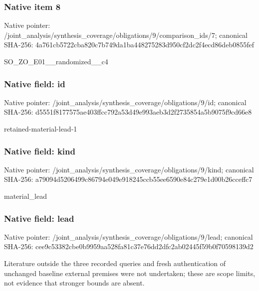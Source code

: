 \documentclass[10pt,a4paper]{article}
\begin{document}
\subsubsection{Native item 8}
Native pointer: /joint\_\allowbreak{}analysis/synthesis\_\allowbreak{}coverage/obligations/9/comparison\_\allowbreak{}ids/7; canonical SHA-256: 4a761cb5722cba820c7b749da1ba448275283d950cf2dc2f4ecd86deb0855fef

\begingroup\raggedright\sloppy SO\_\allowbreak{}ZO\_\allowbreak{}E01\_\allowbreak{}\_\allowbreak{}randomized\_\allowbreak{}\_\allowbreak{}c4\par\endgroup

\subsubsection{Native field: id}
Native pointer: /joint\_\allowbreak{}analysis/synthesis\_\allowbreak{}coverage/obligations/9/id; canonical SHA-256: d5551f8177575ae403ffcc792a53d49e993aeb3d2f2735854a5b9075f9cd66e8

\begingroup\raggedright\sloppy retained-material-lead-1\par\endgroup

\subsubsection{Native field: kind}
Native pointer: /joint\_\allowbreak{}analysis/synthesis\_\allowbreak{}coverage/obligations/9/kind; canonical SHA-256: a79094d5206499c86794e049e918245ccb55ee6590e84c279e1d00b26cceffc7

\begingroup\raggedright\sloppy material\_\allowbreak{}lead\par\endgroup

\subsubsection{Native field: lead}
Native pointer: /joint\_\allowbreak{}analysis/synthesis\_\allowbreak{}coverage/obligations/9/lead; canonical SHA-256: cee9c53382cbe0b9959aa528fa81c37e76dd2dfc2ab02445f59b0f70598139d2

\begingroup\raggedright\sloppy Literature outside the three recorded queries and fresh authentication of unchanged baseline external premises were not undertaken;\allowbreak{} these are scope limits,\allowbreak{} not evidence that stronger bounds are absent.\par\endgroup
\end{document}

